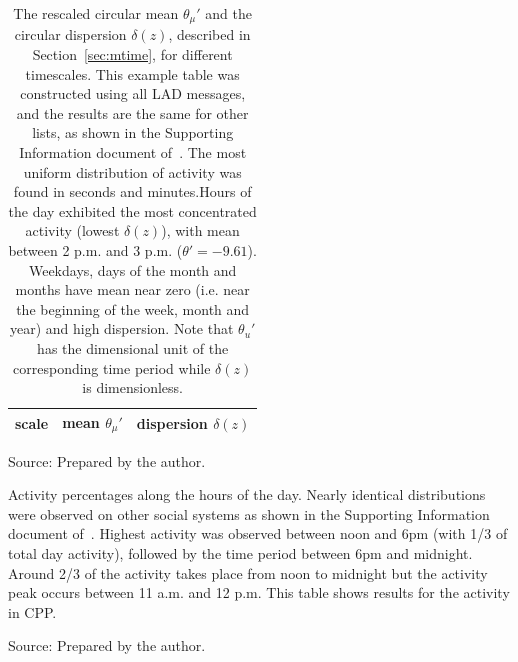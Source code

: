 \begin{table}
\caption{The rescaled circular mean $\theta_\mu'$ and the circular dispersion $\delta(z)$, described in Section~\ref{sec:mtime}, for different timescales. This example table was constructed using all LAD messages, and the results are the same for other lists, as shown in the Supporting Information document of~\cite{stab}. The most uniform distribution of activity was found in seconds and minutes.Hours of the day exhibited the most concentrated activity (lowest $\delta(z)$), with mean between 2 p.m. and 3 p.m. ($\theta'=-9.61$). Weekdays, days of the month and months have mean near zero (i.e. near the beginning of the week, month and year) and high dispersion. Note that $\theta_u'$ has the dimensional unit of the corresponding time period while $\delta(z)$ is dimensionless.}
\begin{center}
\begin{tabular}{ |l|| c|c| }
\hline
scale & mean $\theta_\mu'$ & dispersion $\delta(z)$  \\ \hline

\end{tabular}
\begin{flushleft}
Source: Prepared by the author.\
\end{flushleft}
\end{center}
\label{tab:circ}
\end{table}

\begin{table}
\caption{Activity percentages along the hours of the day. Nearly identical distributions were observed on other social systems as shown in the Supporting Information document of~\cite{stab}.
Highest activity was observed between noon and 6pm (with 1/3 of total day activity), followed by the time period between 6pm and midnight.
Around 2/3 of the activity takes place from noon to midnight
but the activity peak occurs between 11 a.m. and 12 p.m.
This table shows results for the activity in CPP.}
\footnotesize

\label{tab:hin}
\begin{flushleft}
Source: Prepared by the author.\
\end{flushleft}
\end{table}


